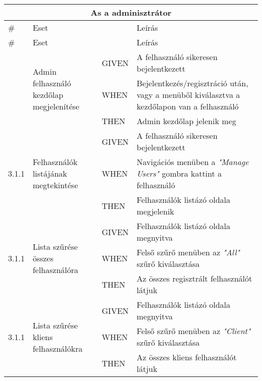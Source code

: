 \begin{center}
	\begin{longtable}{ | p{} | p{} | p{} | p{} | }
			
			\hline
			\multicolumn{4}{|c|}{\textbf{As a adminisztrátor}}
			\\ \hline
			
			\# & Eset & & Leírás
			\\ \hline \hline
			\endfirsthead %
			
			\hline
			\# & Eset & & Leírás
			\\ \hline \hline
			\endhead %
			
			\hline
			\endfoot %
			
			\endlastfoot %

			\multirow{3}{*}{3.0.1} 
			& \multirow{3}{=}{Admin felhasználó kezdőlap megjelenítése} 
			& GIVEN 
			& A felhasználó sikeresen bejelentkezett \\
			\cline{3-4}
			& & WHEN 
			& Bejelentkezés/regisztráció után, vagy a menüből kiválasztva a kezdőlapon van a felhasználó \\
			\cline{3-4}
			& & THEN 
			& Admin kezdőlap jelenik meg \\
			\hline
			
			\multirow{3}{*}{3.1.1} 
			& \multirow{3}{=}{Felhasználók listájának megtekintése} 
			& GIVEN 
			& A felhasználó sikeresen bejelentkezett \\
			\cline{3-4}
			& & WHEN 
			& Navigációs menüben a \emph{"Manage Users"} gombra kattint a felhasználó \\
			\cline{3-4}
			& & THEN 
			& Felhasználók listázó oldala megjelenik \\
			\hline

			\multirow{3}{*}{3.1.1} 
			& \multirow{3}{=}{Lista szűrése összes felhasználóra} 
			& GIVEN 
			& Felhasználók listázó oldala megnyitva \\
			\cline{3-4}
			& & WHEN 
			& Felső szűrő menüben az \emph{"All"} szűrő kiválasztása \\
			\cline{3-4}
			& & THEN 
			& Az összes regisztrált felhasználót látjuk \\
			\hline

			\multirow{3}{*}{3.1.1} 
			& \multirow{3}{=}{Lista szűrése kliens felhasználókra} 
			& GIVEN 
			& Felhasználók listázó oldala megnyitva \\
			\cline{3-4}
			& & WHEN 
			& Felső szűrő menüben az \emph{"Client"} szűrő kiválasztása \\
			\cline{3-4}
			& & THEN 
			& Az összes kliens felhasználót látjuk \\
			\hline


\end{longtable}
\end{center}
